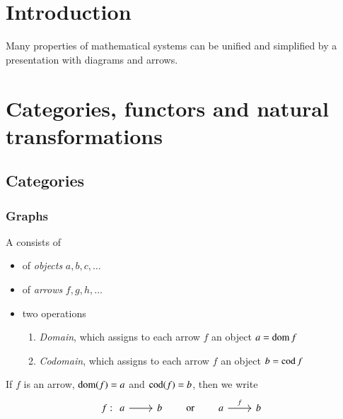 \chapter{Introduction}
Many properties of mathematical systems can be unified and simplified by a presentation with diagrams and arrows.
\chapter{Categories, functors and natural transformations}
\section{Categories}
\subsection{Graphs}
\begin{definition}
A  consists of
\begin{itemize}
\item of \emph{objects} $a,b,c,\ldots$
\item of \emph{arrows} $f,g,h,\ldots$
\item two operations
\begin{enumerate}
\item \emph{Domain}, which assigns to each arrow $f$ an object $a = \operatorname{dom} f$
\item \emph{Codomain}, which assigns to each arrow $f$ an object $b = \operatorname{cod} f$
\end{enumerate}
\end{itemize}
\end{definition}
If $f$ is an arrow, $\operatorname{dom}(f) = a$ and $\operatorname{cod}(f) = b$, then we write
\[ f: \begin{tikzcd}
a \rar & b
\end{tikzcd} \qquad \text{or} \qquad \begin{tikzcd}
a \rar{f} & b
\end{tikzcd} \]

